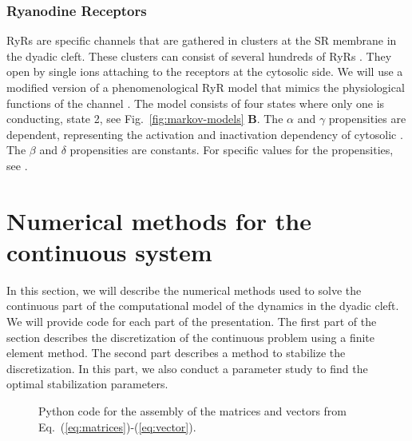 \subsubsection*{Ryanodine Receptors}
\label{sec:ryr}
RyRs are \Ca specific channels that are gathered in clusters at the SR membrane in the dyadic cleft. These clusters can consist of several hundreds of RyRs \cite{BeuckelmannWier1988,Franzini-ArmstrongProtasiEtAl1999}. They open by single \Ca ions attaching to the receptors at the cytosolic side. We will use a modified version of a phenomenological RyR model that mimics the physiological functions of the channel \cite{SternSongEtAl1999}. The model consists of four states where only one is conducting, state 2, see Fig.~\ref{fig:markov-models} \textbf{B}. The $\alpha$ and $\gamma$ propensities are \Ca dependent, representing the activation and inactivation dependency of cytosolic \CaC. The $\beta$ and $\delta$ propensities are constants. For specific values for the propensities, see \citet{SternSongEtAl1999}.\par

\section{Numerical methods for the continuous system}
In this section, we will describe the numerical methods used to solve the continuous part of the computational model of the \Ca dynamics in the dyadic cleft. We will provide \pydolfin code for each part of the presentation. The first part of the section describes the discretization of the continuous problem using a finite element method. The second part describes a method to stabilize the discretization. In this part, we also conduct a parameter study to find the optimal stabilization parameters.\par
\begin{figure}
  \centering
  \vspace{-1.5em}
  \caption{Python code for the assembly of the matrices and vectors from Eq.~(\ref{eq:matrices})-(\ref{eq:vector}).}
  \label{fig:assembly-algorithm}
\end{figure}

